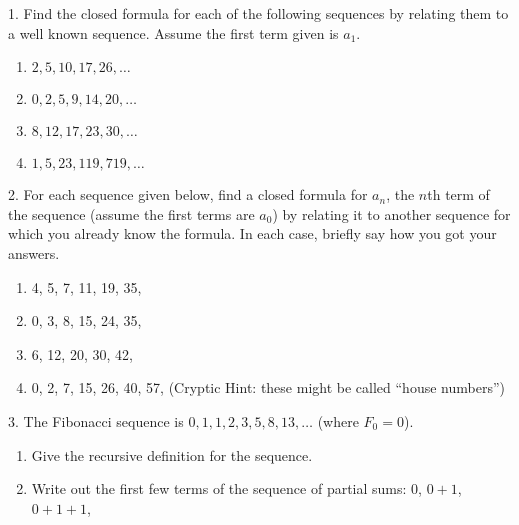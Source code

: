 \documentclass[10pt,]{book}
\theoremstyle{plain}
\theoremstyle{definition}
\theoremstyle{definition}
\theoremstyle{definition}
\theoremstyle{definition}
\numberwithin{equation}{chapter}
\begin{document}
\begin{exerciselist}
\item[1.]\hypertarget{exercise-1}{}\hypertarget{p-82}{}%
Find the closed formula for each of the following sequences by relating them to a well known sequence. Assume the first term given is \(a_1\).%
\leavevmode%
\begin{enumerate}[label=(\alph*)]
\item\hypertarget{li-54}{}\(2, 5, 10, 17, 26, \ldots\)%
\item\hypertarget{li-55}{}\(0, 2, 5, 9, 14, 20, \ldots\)%
\item\hypertarget{li-56}{}\(8, 12, 17, 23, 30,\ldots\)%
\item\hypertarget{li-57}{}\(1, 5, 23, 119, 719,\ldots\)%
\end{enumerate}
\par\smallskip
\item[2.]\hypertarget{exercise-2}{}\hypertarget{p-84}{}%
For each sequence given below, find a closed formula for \(a_n\), the \(n\)th term of the sequence (assume the first terms are \(a_0\)) by relating it to another sequence for which you already know the formula. In each case, briefly say how you got your answers.%
\leavevmode%
\begin{enumerate}[label=(\alph*)]
\item\hypertarget{li-62}{}\hypertarget{p-85}{}%
4, 5, 7, 11, 19, 35, \textellipsis{} %
\item\hypertarget{li-63}{}\hypertarget{p-86}{}%
0, 3, 8, 15, 24, 35, \textellipsis{} %
\item\hypertarget{li-64}{}\hypertarget{p-87}{}%
6, 12, 20, 30, 42, \textellipsis{} %
\item\hypertarget{li-65}{}\hypertarget{p-88}{}%
0, 2, 7, 15, 26, 40, 57, \textellipsis{} (Cryptic Hint: these might be called ``house numbers'') %
\end{enumerate}
\par\smallskip
\item[3.]\hypertarget{exercise-3}{}\hypertarget{p-89}{}%
The Fibonacci sequence is \(0, 1, 1, 2, 3, 5, 8, 13, \ldots\) (where \(F_0 = 0\)).%
\par
\hypertarget{p-90}{}%
\leavevmode%
\begin{enumerate}[label=(\alph*)]
\item\hypertarget{li-66}{}\hypertarget{p-91}{}%
Give the recursive definition for the sequence.%
\item\hypertarget{li-67}{}\hypertarget{p-92}{}%
Write out the first few terms of the sequence of partial sums: \(0\), \(0+1\), \(0+1+1\),\textellipsis{}%

\end{enumerate}
\end{exerciselist}
\end{document}
